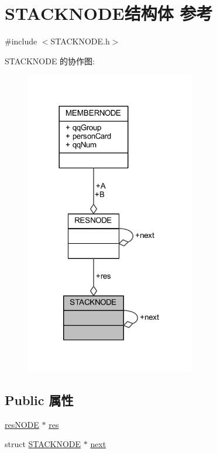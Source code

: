 \hypertarget{struct_s_t_a_c_k_n_o_d_e}{}\section{S\+T\+A\+C\+K\+N\+O\+D\+E结构体 参考}
\label{struct_s_t_a_c_k_n_o_d_e}


{\ttfamily \#include $<$S\+T\+A\+C\+K\+N\+O\+D\+E.\+h$>$}



S\+T\+A\+C\+K\+N\+O\+DE 的协作图\+:
\nopagebreak
\begin{figure}[H]
\begin{center}
\leavevmode
\includegraphics[width=209pt]{struct_s_t_a_c_k_n_o_d_e__coll__graph}
\end{center}
\end{figure}
\subsection*{Public 属性}
\begin{DoxyCompactItemize}
\item 
\hyperlink{res_node_8h_a99a496180780a83679ea667c9bc79fec}{res\+N\+O\+DE} $\ast$ \hyperlink{struct_s_t_a_c_k_n_o_d_e_afbbdf65611e982f361a73587b22aa862}{res}
\item 
struct \hyperlink{struct_s_t_a_c_k_n_o_d_e}{S\+T\+A\+C\+K\+N\+O\+DE} $\ast$ \hyperlink{struct_s_t_a_c_k_n_o_d_e_a50a11b6592f7f4903de61e4883bd7e34}{next}
\end{DoxyCompactItemize}


